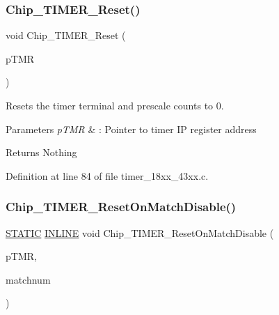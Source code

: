 \subsubsection{\texorpdfstring{Chip\+\_\+\+T\+I\+M\+E\+R\+\_\+\+Reset()}{Chip\_TIMER\_Reset()}}
{\footnotesize\ttfamily void Chip\+\_\+\+T\+I\+M\+E\+R\+\_\+\+Reset (\begin{DoxyParamCaption}\item[{\hyperlink{struct_l_p_c___t_i_m_e_r___t}{L\+P\+C\+\_\+\+T\+I\+M\+E\+R\+\_\+T} $\ast$}]{p\+T\+MR }\end{DoxyParamCaption})}



Resets the timer terminal and prescale counts to 0. 


\begin{DoxyParams}{Parameters}
{\em p\+T\+MR} & \+: Pointer to timer IP register address \\
\hline
\end{DoxyParams}
\begin{DoxyReturn}{Returns}
Nothing 
\end{DoxyReturn}


Definition at line 84 of file timer\+\_\+18xx\+\_\+43xx.\+c.

\mbox{\label{group___t_i_m_e_r__18_x_x__43_x_x_gae203cf1a04cbbf63e966de3a5bd9c29e}} 
\subsubsection{\texorpdfstring{Chip\+\_\+\+T\+I\+M\+E\+R\+\_\+\+Reset\+On\+Match\+Disable()}{Chip\_TIMER\_ResetOnMatchDisable()}}
{\footnotesize\ttfamily \hyperlink{group___l_p_c___types___public___macros_ga10b2d890d871e1489bb02b7e70d9bdfb}{S\+T\+A\+T\+IC} \hyperlink{spifi__18xx__43xx_8h_a2eb6f9e0395b47b8d5e3eeae4fe0c116}{I\+N\+L\+I\+NE} void Chip\+\_\+\+T\+I\+M\+E\+R\+\_\+\+Reset\+On\+Match\+Disable (\begin{DoxyParamCaption}\item[{\hyperlink{struct_l_p_c___t_i_m_e_r___t}{L\+P\+C\+\_\+\+T\+I\+M\+E\+R\+\_\+T} $\ast$}]{p\+T\+MR,  }\item[{int8\+\_\+t}]{matchnum }\end{DoxyParamCaption})}



